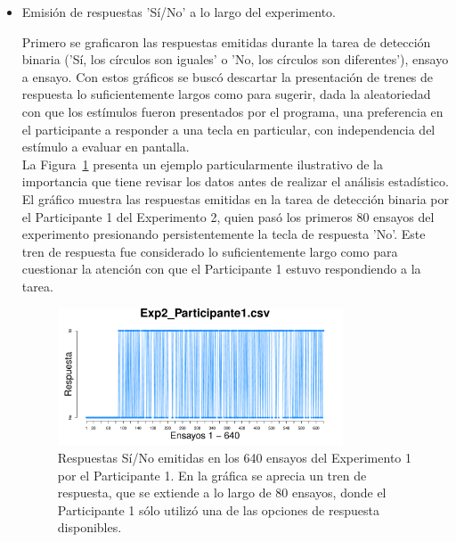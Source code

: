 \begin{itemize}
	\item Emisión de respuestas 'Sí/No' a lo largo del experimento.

Primero se graficaron las respuestas emitidas durante la tarea de detección binaria ('Sí, los círculos son iguales' o 'No, los círculos son diferentes'), ensayo a ensayo. Con estos gráficos se buscó descartar la presentación de trenes de respuesta lo suficientemente largos como para sugerir, dada la aleatoriedad con que los estímulos fueron presentados por el programa, una preferencia en el participante a responder a una tecla en particular, con independencia del estímulo a evaluar en pantalla.\\

La Figura~\ref{fig:Resp_E2_P1} presenta un ejemplo particularmente ilustrativo de la importancia que tiene revisar los datos antes de realizar el análisis estadístico. El gráfico muestra las respuestas emitidas en la tarea de detección binaria por el Participante 1 del Experimento 2, quien pasó los primeros 80 ensayos del experimento presionando persistentemente la tecla de respuesta 'No'. Este tren de respuesta fue considerado lo suficientemente largo como para cuestionar la atención con que el Participante 1 estuvo respondiendo a la tarea.\\ 

\begin{figure}[th]
\centering
\includegraphics[width=0.80\textwidth]{Figures/Response_Exp2_P1} 
\caption[Respuesta emitida por ensayo: Ejemplo de participante sesgado]{Respuestas Sí/No emitidas en los 640 ensayos del Experimento 1 por el Participante 1. En la gráfica se aprecia un tren de respuesta, que se extiende a lo largo de 80 ensayos, donde el Participante 1 sólo utilizó una de las opciones de respuesta disponibles.}
\label{fig:Resp_E2_P1}
\end{figure}



\end{itemize}
